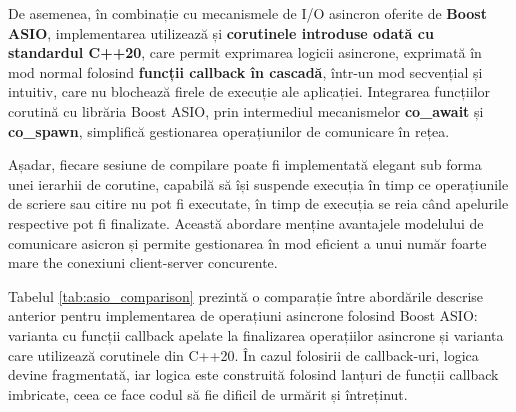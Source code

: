 De asemenea, în combinație cu mecanismele de I/O asincron oferite de \textbf{Boost ASIO}, implementarea utilizează și \textbf{corutinele introduse odată
cu standardul C++20}\cite{c++2020iso}, care permit exprimarea logicii asincrone, exprimată în mod normal folosind \textbf{funcții callback în cascadă},
într-un mod secvențial și intuitiv, care nu blochează firele de execuție ale aplicației. Integrarea funcțiilor corutină cu librăria
Boost ASIO, prin intermediul mecanismelor \textbf{co\_await} și \textbf{co\_spawn}, simplifică gestionarea operațiunilor de comunicare în rețea.

Așadar, fiecare sesiune de compilare poate fi implementată elegant sub forma unei ierarhii de corutine, capabilă să își suspende execuția în timp
ce operațiunile de scriere sau citire nu pot fi executate, în timp de execuția se reia când apelurile respective pot fi finalizate. Această abordare
menține avantajele modelului de comunicare asicron și permite gestionarea în mod eficient a unui număr foarte mare the conexiuni client-server
concurente.

Tabelul \ref{tab:asio_comparison} prezintă o comparație între abordările descrise anterior pentru implementarea de operațiuni asincrone folosind Boost ASIO: varianta cu funcții
callback apelate la finalizarea operațiilor asincrone și varianta care utilizează corutinele din C++20. În cazul folosirii de callback-uri, logica devine
fragmentată, iar logica este construită folosind lanțuri de funcții callback imbricate, ceea ce face codul să fie dificil de urmărit și întreținut.

